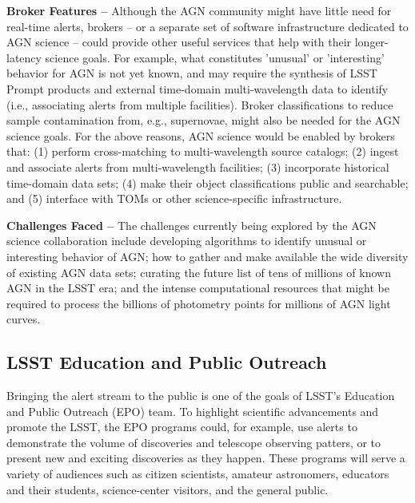 {\bf Broker Features --}
Although the AGN community might have little need for real-time alerts, brokers -- or a separate set of software infrastructure dedicated to AGN science -- could provide other useful services that help with their longer-latency science goals.
For example, what constitutes 'unusual' or 'interesting' behavior for AGN is not yet known, and may require the synthesis of LSST Prompt products and external time-domain multi-wavelength data to identify (i.e., associating alerts from multiple facilities).
Broker classifications to reduce sample contamination from, e.g., supernovae, might also be needed for the AGN science goals.
For the above reasons, AGN science would be enabled by brokers that:
(1) perform cross-matching to multi-wavelength source catalogs; 
(2) ingest and associate alerts from multi-wavelength facilities; 
(3) incorporate historical time-domain data sets; 
(4) make their object classifications public and searchable; and 
(5) interface with TOMs or other science-specific infrastructure.

{\bf Challenges Faced --}
The challenges currently being explored by the AGN science collaboration include developing algorithms to identify unusual or interesting behavior of AGN;
how to gather and make available the wide diversity of existing AGN data sets;
curating the future list of tens of millions of known AGN in the LSST era;
and the intense computational resources that might be required to process the billions of photometry points for millions of AGN light curves.

\subsection{LSST Education and Public Outreach}\label{ssec:sci_epo}

Bringing the alert stream to the public is one of the goals of LSST's Education and Public Outreach (EPO) team.
To highlight scientific advancements and promote the LSST, the EPO programs could, for example, use alerts to demonstrate the volume of discoveries and telescope observing patters, or to present new and exciting discoveries as they happen.
These programs will serve a variety of audiences such as citizen scientists, amateur astronomers, educators and their students, science-center visitors, and the general public.

